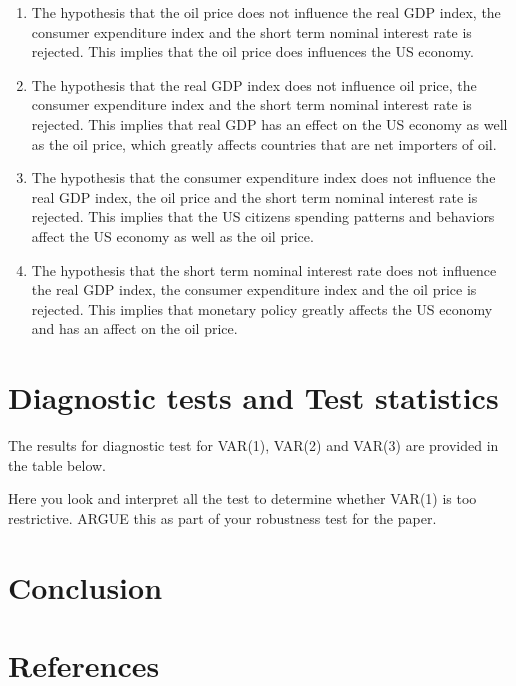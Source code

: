 \documentclass[11pt,preprint, authoryear]{elsarticle}
\numberwithin{equation}{section}
\numberwithin{figure}{section}
\numberwithin{table}{section}
\begin{document}
\begin{enumerate}
\item The hypothesis that the oil price does not influence the real GDP index, the consumer expenditure index and the short term nominal interest rate is rejected. This implies that the oil price does influences the US economy. 
\item The hypothesis that the real GDP index does not influence oil price, the consumer expenditure index and the short term nominal interest rate is rejected. This implies that real GDP has an effect on the US economy as well as the oil price, which greatly affects countries that are net importers of oil. 
\item The hypothesis that the consumer expenditure index does not influence the real GDP index, the oil price and the short term nominal interest rate is rejected. This implies that the US citizens spending patterns and behaviors affect the US economy as well as the oil price. 
\item The hypothesis that the short term nominal interest rate does not influence the real GDP index, the consumer expenditure index and the oil price is rejected. This implies that monetary policy greatly affects the US economy and has an affect on the oil price.
\end{enumerate}

\hypertarget{diagnostic-tests-and-test-statistics}{%
\section{Diagnostic tests and Test
statistics}\label{diagnostic-tests-and-test-statistics}}

The results for diagnostic test for VAR(1), VAR(2) and VAR(3) are
provided in the table below.

Here you look and interpret all the test to determine whether VAR(1) is
too restrictive. ARGUE this as part of your robustness test for the
paper.

\hypertarget{conclusion}{%
\section{Conclusion}\label{conclusion}}

\newpage

\hypertarget{references}{%
\section*{References}\label{references}}
\end{document}
